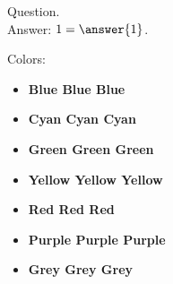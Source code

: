 \documentclass{ximera}
\author{Lee Wayand}
\begin{document}
\begin{exercise}

Question. \\
Answer: $ 1 = \answer{1}$.






Colors:


\begin{itemize}
\item \textbf{\textcolor[rgb]{0.266,0.466,0.066}{Blue Blue Blue}} \\
\item \textbf{\textcolor[rgb]{0.4,0.8,0.933}{Cyan Cyan Cyan}} \\
\item \textbf{\textcolor[rgb]{0.133,0.533,0.2}{Green Green Green}} \\
\item \textbf{\textcolor[rgb]{0.8,0.733,0.266}{Yellow Yellow Yellow}} \\
\item \textbf{\textcolor[rgb]{0.933,0.4,0.466}{Red Red Red}} \\
\item \textbf{\textcolor[rgb]{0.666,0.2,0.466}{Purple Purple Purple}} \\
\item \textbf{\textcolor[rgb]{0.733,0.733,0.733}{Grey Grey Grey}} \\
\end{itemize}


\end{exercise}
\end{document}

